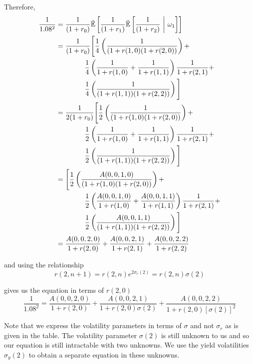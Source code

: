 \documentclass[12pt]{article}
\newlength\tindent
\renewcommand{\indent}{\hspace*{\tindent}}
\newcommand{\E}{\mathbb E}
\begin{document}
Therefore,
\begin{align*}
	\frac{1}{1.08^2} &= \frac{1}{(1 + r_0)} \tilde{\E} \left[ \frac{1}{(1 + r_1)} \tilde{\E} \left[ \frac{1}{(1 + r_2)} ~\bigg|~ \omega_1 \right] \right] \\
	&= \frac{1}{(1 + r_0)} \Bigg[ \frac{1}{4} \left( \frac{1}{(1 + r(1,0)(1 + r(2,0))}\right) + \\
	&\hphantom{{}={---}} \frac{1}{4}\left( \frac{1}{1 + r(1,0)} + \frac{1}{1 + r(1,1)} \right) \frac{1}{1 + r(2,1)} + \\
	&\hphantom{{}={---}} \frac{1}{4} \left( \frac{1}{(1 + r(1,1))(1 + r(2,2))} \right) \Bigg] \\
	&= \frac{1}{2(1 + r_0)} \Bigg[ \frac{1}{2} \left( \frac{1}{(1 + r(1,0)(1 + r(2,0))}\right) + \\
	&\hphantom{{}={---}} \frac{1}{2}\left( \frac{1}{1 + r(1,0)} + \frac{1}{1 + r(1,1)} \right) \frac{1}{1 + r(2,1)} + \\
	&\hphantom{{}={---}} \frac{1}{2} \left( \frac{1}{(1 + r(1,1))(1 + r(2,2))} \right) \Bigg] \\
	&= \Bigg[ \frac{1}{2} \left( \frac{ A(0,0,1,0) }{(1 + r(1,0)(1 + r(2,0))}\right) + \\
	&\hphantom{{}={---}} \frac{1}{2}\left( \frac{ A(0,0,1,0) }{1 + r(1,0)} + \frac{ A(0,0,1,1) }{1 + r(1,1)} \right) \frac{1}{1 + r(2,1)} + \\
	&\hphantom{{}={---}} \frac{1}{2} \left( \frac{A(0,0,1,1)}{(1 + r(1,1))(1 + r(2,2))} \right) \Bigg] \\
	&= \frac{ A(0,0,2,0) }{ 1 + r(2,0) } + \frac{ A(0,0,2,1) }{ 1 + r(2,1) } + \frac{ A(0,0,2,2) }{ 1 + r(2,2) }
\end{align*}

and using the relationship
\begin{equation*}
	r(2,n + 1) = r(2,n) e^{2\sigma_r(2)} = r(2,n)\sigma(2)
\end{equation*}

gives us the equation in terms of $r(2,0)$
\begin{equation*}
	\frac{1}{1.08^2} = \frac{ A(0,0,2,0) }{ 1 + r(2,0) } + \frac{ A(0,0,2,1) }{ 1 + r(2,0)\sigma(2) } + \frac{ A(0,0,2,2) }{ 1 + r(2,0)[\sigma(2)]^2 }
\end{equation*}

\indent Note that we express the volatility parameters in terms of $\sigma$ and not $\sigma_r$ as is given in the table. The volatility parameter $\sigma(2)$ is still unknown to us and so our equation is still intractable with two unknowns. We use the yield volatilities $\sigma_y(2)$ to obtain a separate equation in these unknowns. \\
\end{document}
